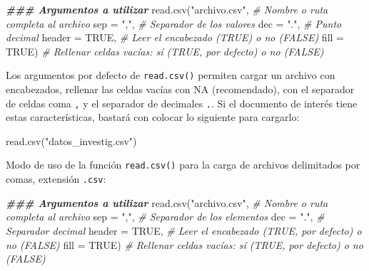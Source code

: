 \documentclass[
]{article}
\newenvironment{Shaded}{\begin{snugshade}}{\end{snugshade}}
\newcommand{\AttributeTok}[1]{\textcolor[rgb]{0.77,0.63,0.00}{#1}}
\newcommand{\CommentTok}[1]{\textcolor[rgb]{0.56,0.35,0.01}{\textit{#1}}}
\newcommand{\ConstantTok}[1]{\textcolor[rgb]{0.00,0.00,0.00}{#1}}
\newcommand{\DocumentationTok}[1]{\textcolor[rgb]{0.56,0.35,0.01}{\textbf{\textit{#1}}}}
\newcommand{\FunctionTok}[1]{\textcolor[rgb]{0.00,0.00,0.00}{#1}}
\newcommand{\NormalTok}[1]{#1}
\newcommand{\StringTok}[1]{\textcolor[rgb]{0.31,0.60,0.02}{#1}}
\theoremstyle{definition}
\theoremstyle{definition}
\theoremstyle{definition}
\theoremstyle{definition}
\theoremstyle{remark}
\begin{document}
\begin{Shaded}
\begin{Highlighting}[]
\DocumentationTok{\#\#\# Argumentos a utilizar}
\FunctionTok{read.csv}\NormalTok{(}\StringTok{"archivo.csv"}\NormalTok{, }\CommentTok{\# Nombre o ruta completa al archivo}
         \AttributeTok{sep =} \StringTok{","}\NormalTok{,     }\CommentTok{\# Separador de los valores}
         \AttributeTok{dec =} \StringTok{"."}\NormalTok{,     }\CommentTok{\# Punto decimal}
         \AttributeTok{header =} \ConstantTok{TRUE}\NormalTok{, }\CommentTok{\# Leer el encabezado (TRUE) o no (FALSE)}
         \AttributeTok{fill =} \ConstantTok{TRUE}\NormalTok{)   }\CommentTok{\# Rellenar celdas vacías: sí (TRUE, por defecto) o no (FALSE)}
\end{Highlighting}
\end{Shaded}

Los argumentos por defecto de \texttt{read.csv()} permiten cargar un archivo con encabezados, rellenar las celdas vacías con NA (recomendado), con el separador de celdas coma \texttt{,} y el separador de decimales \texttt{.}. Si el documento de interés tiene estas características, bastará con colocar lo siguiente para cargarlo:

\begin{Shaded}
\begin{Highlighting}[]
\FunctionTok{read.csv}\NormalTok{(}\StringTok{"datos\_investig.csv"}\NormalTok{)}
\end{Highlighting}
\end{Shaded}

Modo de uso de la función \texttt{read.csv()} para la carga de archivos delimitados por comas, extensión \texttt{.csv}:

\begin{Shaded}
\begin{Highlighting}[]
\DocumentationTok{\#\#\# Argumentos a utilizar}
\FunctionTok{read.csv}\NormalTok{(}\StringTok{"archivo.csv"}\NormalTok{, }\CommentTok{\# Nombre o ruta completa al archivo}
         \AttributeTok{sep =} \StringTok{","}\NormalTok{,     }\CommentTok{\# Separador de los elementos}
         \AttributeTok{dec =} \StringTok{"."}\NormalTok{,     }\CommentTok{\# Separador decimal}
         \AttributeTok{header =} \ConstantTok{TRUE}\NormalTok{, }\CommentTok{\# Leer el encabezado (TRUE, por defecto) o no (FALSE)}
         \AttributeTok{fill =} \ConstantTok{TRUE}\NormalTok{)   }\CommentTok{\# Rellenar celdas vacías: sí (TRUE, por defecto) o no (FALSE)}
\end{Highlighting}
\end{Shaded}
\end{document}
